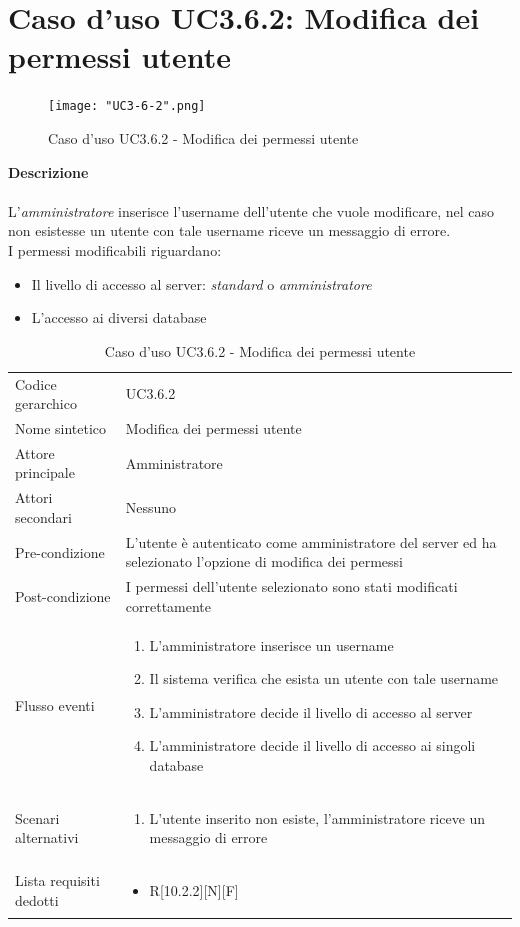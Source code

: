 \documentclass[a4paper]{report}
\begin{document}
	 \section{Caso d'uso UC3.6.2: Modifica dei permessi utente}
	 \begin{figure}[H]
			\centering
			\texttt{[image: "UC3-6-2".png]}
			\caption{Caso d'uso UC3.6.2 - Modifica dei permessi utente}
		\end{figure}
	 \textbf{Descrizione} \\ \\
	 L'\emph{amministratore} inserisce l'username dell'utente che vuole modificare, nel caso non esistesse
	  un utente con tale username riceve un messaggio di errore. \\
	 I permessi modificabili riguardano:
	 \begin{itemize}
	 	\item Il livello di accesso al server: \emph{standard} o \emph{amministratore}
	 	\item L'accesso ai diversi database
	 \end{itemize}
		\begin{table}[H]
		\begin{tabularx}{\textwidth}{X | X}\toprule
			\rowcolor{orange!65}Codice gerarchico & UC3.6.2 \\
			Nome sintetico & Modifica dei permessi utente \\
			\rowcolor{orange!65}Attore principale & Amministratore\\
			Attori secondari & Nessuno \\
			\rowcolor{orange!65}Pre-condizione & L'utente è autenticato come amministratore del server ed
			 ha selezionato l'opzione di modifica dei permessi\\
			Post-condizione & I permessi dell'utente selezionato sono stati modificati correttamente \\
			\rowcolor{orange!65}Flusso eventi & \begin{enumerate}
			\item L'amministratore inserisce un username
			\item Il sistema verifica che esista un utente con tale username
			\item L'amministratore decide il livello di accesso al server
			\item L'amministratore decide il livello di accesso ai singoli database
			\end{enumerate} \\
			Scenari alternativi & \begin{enumerate}
			\item L'utente inserito non esiste, l'amministratore riceve un messaggio di errore
			\end{enumerate} \\
			\rowcolor{orange!65}Lista requisiti dedotti & \begin{itemize}
				\item R[10.2.2][N][F]
				\end{itemize} \\
			\bottomrule
		\end{tabularx}
		\caption{Caso d'uso UC3.6.2 - Modifica dei permessi utente}
	 \end{table}
\end{document}
